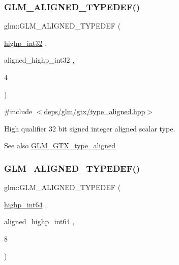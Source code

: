 \subsubsection{\texorpdfstring{G\+L\+M\+\_\+\+A\+L\+I\+G\+N\+E\+D\+\_\+\+T\+Y\+P\+E\+D\+E\+F()}{GLM\_ALIGNED\_TYPEDEF()}\hspace{0.1cm}{\footnotesize\ttfamily [27/209]}}
{\footnotesize\ttfamily glm\+::\+G\+L\+M\+\_\+\+A\+L\+I\+G\+N\+E\+D\+\_\+\+T\+Y\+P\+E\+D\+EF (\begin{DoxyParamCaption}\item[{\hyperlink{group__gtc__type__precision_gaa2045c92b9553d463191af6a20e997bb}{highp\+\_\+int32}}]{,  }\item[{aligned\+\_\+highp\+\_\+int32}]{,  }\item[{4}]{ }\end{DoxyParamCaption})}



{\ttfamily \#include $<$\hyperlink{gtx_2type__aligned_8hpp}{deps/glm/gtx/type\+\_\+aligned.\+hpp}$>$}

High qualifier 32 bit signed integer aligned scalar type. \begin{DoxySeeAlso}{See also}
\hyperlink{group__gtx__type__aligned}{G\+L\+M\+\_\+\+G\+T\+X\+\_\+type\+\_\+aligned} 
\end{DoxySeeAlso}
\mbox{\label{group__gtx__type__aligned_ga46bbf08dc004d8c433041e0b5018a5d3}} 
\subsubsection{\texorpdfstring{G\+L\+M\+\_\+\+A\+L\+I\+G\+N\+E\+D\+\_\+\+T\+Y\+P\+E\+D\+E\+F()}{GLM\_ALIGNED\_TYPEDEF()}\hspace{0.1cm}{\footnotesize\ttfamily [28/209]}}
{\footnotesize\ttfamily glm\+::\+G\+L\+M\+\_\+\+A\+L\+I\+G\+N\+E\+D\+\_\+\+T\+Y\+P\+E\+D\+EF (\begin{DoxyParamCaption}\item[{\hyperlink{group__gtc__type__precision_ga7ffb27943e9569800979081bc548621c}{highp\+\_\+int64}}]{,  }\item[{aligned\+\_\+highp\+\_\+int64}]{,  }\item[{8}]{ }\end{DoxyParamCaption})}



